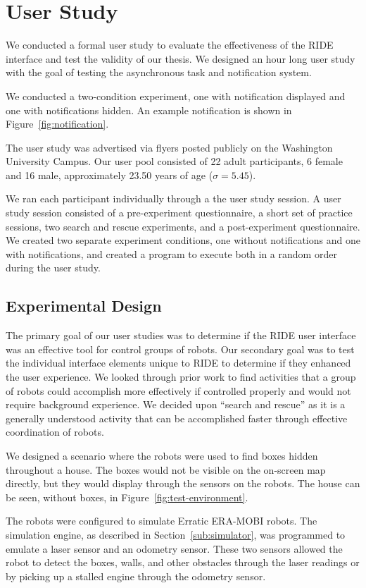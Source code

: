 \chapter{User Study}
We conducted a formal user study to evaluate the effectiveness of the RIDE interface and test the validity of our thesis. We designed an hour long user study with the goal of testing the asynchronous task and notification system.

We conducted a two-condition experiment, one with notification displayed and one with notifications hidden. An example notification is shown in Figure~\ref{fig:notification}. 

The user study was advertised via flyers posted publicly on the Washington University Campus. Our user pool consisted of 22 adult participants, 6 female and 16 male, approximately 23.50 years of age ($\sigma=5.45$).

We ran each participant individually through a the user study session. A user study session consisted of a pre-experiment questionnaire, a short set of practice sessions, two search and rescue experiments, and a post-experiment questionnaire. We created two separate experiment conditions, one without notifications and one with notifications, and created a program to execute both in a random order during the user study.

\section{Experimental Design}
The primary goal of our user studies was to determine if the RIDE user interface was an effective tool for control groups of robots. Our secondary goal was to test the individual interface elements unique to RIDE to determine if they enhanced the user experience. We looked through prior work to find activities that a group of robots could accomplish more effectively if controlled properly and would not require background experience. We decided upon ``search and rescue'' as it is a generally understood activity that can be accomplished faster through effective coordination of robots. 

We designed a scenario where the robots were used to find boxes hidden throughout a house. The boxes would not be visible on the on-screen map directly, but they would display through the sensors on the robots. The house can be seen, without boxes, in Figure~\ref{fig:test-environment}. 

The robots were configured to simulate Erratic ERA-MOBI robots. The simulation engine, as described in Section~\ref{sub:simulator}, was programmed to emulate a laser sensor and an odometry sensor. These two sensors allowed the robot to detect the boxes, walls, and other obstacles through the laser readings or by picking up a stalled engine through the odometry sensor.

